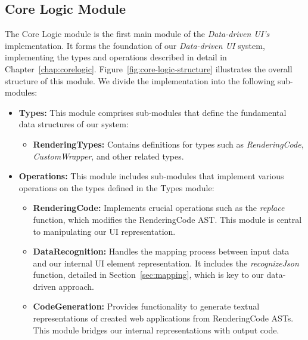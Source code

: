 \subsection{Core Logic Module}
The Core Logic module is the first main module of the \emph{Data-driven UI's} implementation.
It forms the foundation of our \emph{Data-driven UI} system, implementing the types and operations described in detail in Chapter~\ref{chap:corelogic}.
Figure~\ref{fig:core-logic-structure} illustrates the overall structure of this module.
We divide the implementation into the following sub-modules:
\begin{itemize}
	\item \textbf{Types:} This module comprises sub-modules that define the fundamental data structures of our system:
	      \begin{itemize}
		      \item \textbf{RenderingTypes:} Contains definitions for types such as \emph{RenderingCode}, \emph{CustomWrapper}, and other related types.

	      \end{itemize}

	\item \textbf{Operations:} This module includes sub-modules that implement various operations on the types defined in the Types module:
	      \begin{itemize}
		      \item \textbf{RenderingCode:} Implements crucial operations such as the \emph{replace} function, which modifies the RenderingCode AST.
		            This module is central to manipulating our UI representation.

		      \item \textbf{DataRecognition:}  Handles the mapping process between input data and our internal UI element representation.
		            It includes the \emph{recognizeJson} function, detailed in Section~\ref{sec:mapping}, which is key to our data-driven approach.

		      \item\textbf{CodeGeneration:} Provides functionality to generate textual representations of created web applications from RenderingCode ASTs.
		            This module bridges our internal representations with output code.
	      \end{itemize}
\end{itemize}

